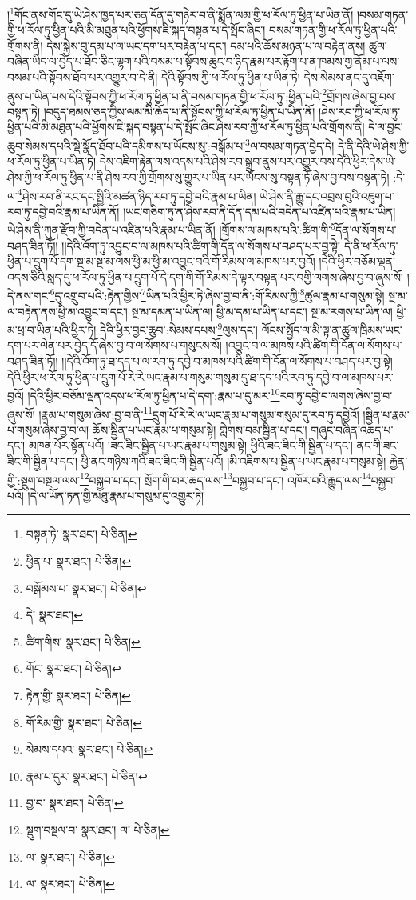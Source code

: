 །\footnote{བསྟན་ཏེ་  སྣར་ཐང་།  པེ་ཅིན། }གོང་ནས་གོང་དུ་ཡེ་ཤེས་ཁྱད་པར་ཅན་དོན་དུ་གཉེར་བ་ནི་སྨོན་ལམ་གྱི་ཕ་རོལ་ཏུ་ཕྱིན་པ་ཡིན་ནོ། །བསམ་གཏན་གྱི་ཕ་རོལ་ཏུ་ཕྱིན་པའི་མི་མཐུན་པའི་ཕྱོགས་ཇི་སྐད་བསྟན་པ་དེ་སྤོང་ཞིང་། བསམ་གཏན་གྱི་ཕ་རོལ་ཏུ་ཕྱིན་པའི་གྲོགས་ནི། དེས་སྐྱེས་བུ་དམ་པ་ལ་ཡང་དག་པར་བརྟེན་པ་དང་། དམ་པའི་ཆོས་མཉན་པ་ལ་བརྟེན་ནས། ཚུལ་བཞིན་ཡིད་ལ་བྱེད་པ་ཐོབ་ཅིང་ལྷག་པའི་བསམ་པ་སྟོབས་ཆུང་བ་ཉིད་རྣམ་པར་རྟོག་པ་ན་ཁམས་གྱ་ནོམ་པ་ལས་བསམ་པའི་སྟོབས་ཐོབ་པར་འགྱུར་བ་དེ་ནི། དེའི་སྟོབས་ཀྱི་ཕ་རོལ་ཏུ་ཕྱིན་པ་ཡིན་ཏེ། དེས་སེམས་ནང་དུ་འཇོག་ནུས་པ་ཡིན་པས་དེའི་སྟོབས་ཀྱི་ཕ་རོལ་ཏུ་ཕྱིན་པ་ནི་བསམ་གཏན་གྱི་ཕ་རོལ་ཏུ་:ཕྱིན་པའི་\footnote{ཕྱིན་པ་  སྣར་ཐང་།  པེ་ཅིན། }གྲོགས་ཞེས་བྱ་བས་བསྟན་ཏེ། །བདུད་ཐམས་ཅད་ཀྱིས་ལམ་མི་ཆོད་པ་ནི་སྟོབས་ཀྱི་ཕ་རོལ་ཏུ་ཕྱིན་པ་ཡིན་ནོ། །ཤེས་རབ་ཀྱི་ཕ་རོལ་ཏུ་ཕྱིན་པའི་མི་མཐུན་པའི་ཕྱོགས་ཇི་སྐད་བསྟན་པ་དེ་སྤོང་ཞིང་ཤེས་རབ་ཀྱི་ཕ་རོལ་ཏུ་ཕྱིན་པའི་གྲོགས་ནི། དེ་ལ་བྱང་ཆུབ་སེམས་དཔའི་སྡེ་སྣོད་ཐོབ་པའི་དམིགས་པ་ཡོངས་སུ་:བསྒོམ་པ་\footnote{བསྒོམས་པ་  སྣར་ཐང་།  པེ་ཅིན། }ལ་བསམ་གཏན་བྱེད་དེ། དེ་ནི་དེའི་ཡེ་ཤེས་ཀྱི་ཕ་རོལ་ཏུ་ཕྱིན་པ་ཡིན་ཏེ། དེས་འཇིག་རྟེན་ལས་འདས་པའི་ཤེས་རབ་སྒྲུབ་ནུས་པར་འགྱུར་བས་དེའི་ཕྱིར་དེས་ཡེ་ཤེས་ཀྱི་ཕ་རོལ་ཏུ་ཕྱིན་པ་ནི་ཤེས་རབ་ཀྱི་གྲོགས་སུ་གྱུར་པ་ཡིན་པར་ཡོངས་སུ་བསྟན་ཏོ་ཞེས་བྱ་བས་བསྟན་ཏེ། :དེ་ལ་\footnote{དེ་  སྣར་ཐང་། }ཤེས་རབ་ནི་རང་དང་སྤྱིའི་མཚན་ཉིད་རབ་ཏུ་དབྱེ་བའི་རྣམ་པ་ཡིན། ཡེ་ཤེས་ནི་རྒྱུ་དང་འབྲས་བུའི་འཇུག་པ་རབ་ཏུ་དབྱེ་བའི་རྣམ་པ་ཡིན་ནོ། །ཡང་གཅིག་ཏུ་ན་ཤེས་རབ་ནི་དོན་དམ་པའི་བདེན་པ་འཛིན་པའི་རྣམ་པ་ཡིན། ཡེ་ཤེས་ནི་ཀུན་རྫོབ་ཀྱི་བདེན་པ་འཛིན་པའི་རྣམ་པ་ཡིན་ནོ། །གྲོགས་ལ་མཁས་པའི་:ཚིག་གི་\footnote{ཚིག་གིས་  སྣར་ཐང་།  པེ་ཅིན། }དོན་ལ་སོགས་པ་བཤད་ཟིན་ཏོ།། །།དེའི་འོག་ཏུ་འབྱུང་བ་ལ་མཁས་པའི་ཚིག་གི་དོན་ལ་སོགས་པ་བཤད་པར་བྱ་སྟེ། དེ་ནི་ཕ་རོལ་ཏུ་ཕྱིན་པ་དྲུག་པོ་དག་སྔ་མ་སྔ་མ་ལས་ཕྱི་མ་ཕྱི་མ་འབྱུང་བའི་གོ་རིམས་ལ་མཁས་པར་བྱའོ། །དེའི་ཕྱིར་བཅོམ་ལྡན་འདས་ཅིའི་སླད་དུ་ཕ་རོལ་ཏུ་ཕྱིན་པ་དྲུག་པོ་དེ་དག་གི་གོ་རིམས་དེ་ལྟར་བསྟན་པར་བགྱི་ལགས་ཞེས་བྱ་བ་ཞུས་སོ། །དེ་ནས་གང་\footnote{གོང་  སྣར་ཐང་།  པེ་ཅིན། }དུ་འགྲུབ་པའི་:རྟེན་གྱིས་\footnote{རྟེན་གྱི་  སྣར་ཐང་།  པེ་ཅིན། }ཡིན་པའི་ཕྱིར་ཏེ་ཞེས་བྱ་བ་ནི་:གོ་རིམས་ཀྱི་\footnote{གོ་རིམ་གྱི་  སྣར་ཐང་།  པེ་ཅིན། }ཚུལ་རྣམ་པ་གསུམ་སྟེ། སྔ་མ་ལ་བརྟེན་ནས་ཕྱི་མ་འབྱུང་བ་དང་། སྔ་མ་དམན་པ་ཡིན་ལ། ཕྱི་མ་དམ་པ་ཡིན་པ་དང་། སྔ་མ་རགས་པ་ཡིན་ལ། ཕྱི་མ་ཕྲ་བ་ཡིན་པའི་ཕྱིར་ཏེ། དེའི་ཕྱིར་བྱང་ཆུབ་:སེམས་དཔས་\footnote{སེམས་དཔའ་  སྣར་ཐང་།  པེ་ཅིན། }ལུས་དང་། ལོངས་སྤྱོད་ལ་མི་ལྟ་ན་ཚུལ་ཁྲིམས་ཡང་དག་པར་ལེན་པར་བྱེད་དོ་ཞེས་བྱ་བ་ལ་སོགས་པ་གསུངས་སོ། །འབྱུང་བ་ལ་མཁས་པའི་ཚིག་གི་དོན་ལ་སོགས་པ་བཤད་ཟིན་ཏོ།། །།དེའི་འོག་ཏུ་ཐ་དད་པ་ལ་རབ་ཏུ་དབྱེ་བ་མཁས་པའི་ཚིག་གི་དོན་ལ་སོགས་པ་བཤད་པར་བྱ་སྟེ། དེའི་ཕྱིར་ཕ་རོལ་ཏུ་ཕྱིན་པ་དྲུག་པོ་རེ་རེ་ཡང་རྣམ་པ་གསུམ་གསུམ་དུ་ཐ་དད་པའི་རབ་ཏུ་དབྱེ་བ་ལ་མཁས་པར་བྱའོ། །དེའི་ཕྱིར་བཅོམ་ལྡན་འདས་ཕ་རོལ་ཏུ་ཕྱིན་པ་དེ་དག་:རྣམ་པ་དུ་མར་\footnote{རྣམ་པ་དུར་  སྣར་ཐང་།  པེ་ཅིན། }རབ་ཏུ་དབྱེ་བ་ལགས་ཞེས་བྱ་བ་ཞུས་སོ། །རྣམ་པ་གསུམ་ཞེས་:བྱ་བ་ནི་\footnote{བྱ་བ་  སྣར་ཐང་།  པེ་ཅིན། }དྲུག་པོ་རེ་རེ་ལ་ཡང་རྣམ་པ་གསུམ་གསུམ་དུ་རབ་ཏུ་དབྱེའོ། །སྦྱིན་པ་རྣམ་པ་གསུམ་ཞེས་བྱ་བ་ལ། ཆོས་སྦྱིན་པ་ཡང་རྣམ་པ་གསུམ་སྟེ། གླེགས་བམ་སྦྱིན་པ་དང་། གཞུང་བཞིན་འཆད་པ་དང་། མཁན་པོར་སྟོན་པའོ། །ཟང་ཟིང་སྦྱིན་པ་ཡང་རྣམ་པ་གསུམ་སྟེ། ཕྱིའི་ཟང་ཟིང་གི་སྦྱིན་པ་དང་། ནང་གི་ཟང་ཟིང་གི་སྦྱིན་པ་དང་། ཕྱི་ནང་གཉིས་ཀའི་ཟང་ཟིང་གི་སྦྱིན་པའོ། །མི་འཇིགས་པ་སྦྱིན་པ་ཡང་རྣམ་པ་གསུམ་སྟེ། རྐྱེན་གྱི་:སྡུག་བསྔལ་ལས་\footnote{སྡུག་བསྔལ་བ་  སྣར་ཐང་། ལ་  པེ་ཅིན། }བསྐྱབ་པ་དང་། སྲོག་གི་བར་ཆད་ལས་\footnote{ལ་  སྣར་ཐང་།  པེ་ཅིན། }བསྐྱབ་པ་དང་། འཁོར་བའི་རྒྱུད་ལས་\footnote{ལ་  སྣར་ཐང་།  པེ་ཅིན། }བསྐྱབ་པའོ། །དེ་ལ་ཡོན་ཏན་གྱི་མཐུ་རྣམ་པ་གསུམ་དུ་འགྱུར་ཏེ། 